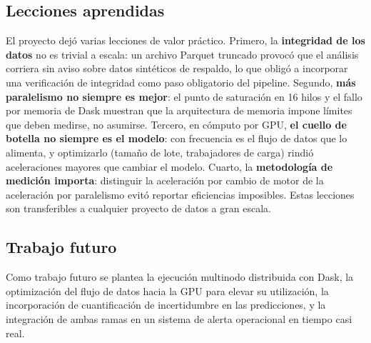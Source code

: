 \documentclass[conference]{IEEEtran}
\begin{document}
\subsection{Lecciones aprendidas}
El proyecto dejó varias lecciones de valor práctico. Primero, la \textbf{integridad de los datos} no es trivial a escala: un archivo Parquet truncado provocó que el análisis corriera sin aviso sobre datos sintéticos de respaldo, lo que obligó a incorporar una verificación de integridad como paso obligatorio del pipeline. Segundo, \textbf{más paralelismo no siempre es mejor}: el punto de saturación en 16 hilos y el fallo por memoria de Dask muestran que la arquitectura de memoria impone límites que deben medirse, no asumirse. Tercero, en cómputo por GPU, \textbf{el cuello de botella no siempre es el modelo}: con frecuencia es el flujo de datos que lo alimenta, y optimizarlo (tamaño de lote, trabajadores de carga) rindió aceleraciones mayores que cambiar el modelo. Cuarto, la \textbf{metodología de medición importa}: distinguir la aceleración por cambio de motor de la aceleración por paralelismo evitó reportar eficiencias imposibles. Estas lecciones son transferibles a cualquier proyecto de datos a gran escala.

\subsection{Trabajo futuro}
Como trabajo futuro se plantea la ejecución multinodo distribuida con Dask, la optimización del flujo de datos hacia la GPU para elevar su utilización, la incorporación de cuantificación de incertidumbre en las predicciones, y la integración de ambas ramas en un sistema de alerta operacional en tiempo casi real.
\end{document}
